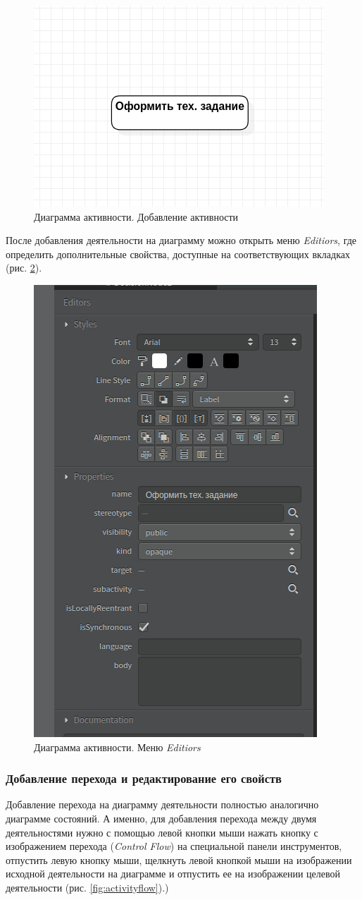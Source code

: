 \documentclass[a4paper,12pt]{extreport}
\begin{document}
\begin{figure}[h!]
	\centering
	\includegraphics[width=0.6\linewidth]{images/activityaction}
	\caption{Диаграмма активности. Добавление активности}
	\label{fig:activityaction}
\end{figure}


После добавления деятельности на диаграмму можно открыть меню \textit{Editiors}, где определить дополнительные свойства, доступные на соответствующих вкладках (рис. \ref{fig:activityeditors}).

\begin{figure}[h!]
	\centering
	\includegraphics[width=0.4\linewidth]{images/activityeditors}
	\caption{Диаграмма активности. Меню \textit{Editiors}}
	\label{fig:activityeditors}
\end{figure}

\subsubsection*{Добавление перехода и редактирование его свойств}

Добавление перехода на диаграмму деятельности полностью аналогично диаграмме состояний. А именно, для добавления перехода между двумя деятельностями нужно с помощью левой кнопки мыши нажать кнопку с изображением перехода (\textit{Control Flow}) на специальной панели инструментов, отпустить левую кнопку мыши, щелкнуть левой кнопкой мыши на изображении исходной деятельности на диаграмме и отпустить ее на изображении целевой деятельности (рис. \ref{fig:activityflow}).)
\end{document}
